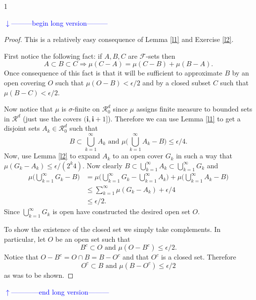 \documentclass[10pt,letterpaper,twocolumn]{article}
\newcommand{\bs}{\boldsymbol}
\def\Ver{1}
\def\LongVer{1}
\begin{document}
\if\Ver\LongVer{ 
{\flushleft\textcolor{blue}{$\downarrow$---------begin long version---------}}\newline



\begin{proof} This is a relatively easy consequence of Lemma \ref{l1} and Exercise \ref{l2}. 


First notice the following fact: if $A,B,C$ are $\mathcal F$-sets then
\begin{equation}
\label{trans}
 A\subset B\subset C \Rightarrow \mu(C-A)=\mu(C-B)+\mu(B-A). \end{equation}
Once consequence of this fact is that it will be sufficient to approximate $B$ by an open covering $O$ such that $\mathcal \mu(O-B)<\epsilon/2$ and by a closed subset $C$ such that $\mathcal \mu(B-C)<\epsilon/2$.

Now notice that $\mu$ is $\sigma$-finite on $\mathcal R_0^d$ 
since $\mu$ assigns finite measure to bounded sets in $\mathcal R^d$ (just use the covers $(\bs i,\bs i+1]$). Therefore we can use Lemma \ref{l1} to get a disjoint sets $A_k\in\mathcal R^d_0$ such that
\[ B\subset \bigcup_{k=1}^\infty A_k \text{ and } \mu\bigl( \bigcup_{k=1}^\infty A_k-B \bigr)\leq \epsilon/4. \]
Now, use Lemma \ref{l2} to expand $A_k$ to an open cover $G_k$ in such a way that $\mu(G_k-A_k)\leq \epsilon /(2^k 4)$. Now clearly $B\subset \bigcup_{k=1}^\infty A_k\subset  \bigcup_{k=1}^\infty G_k$ and 
\begin{align*}
\mu\bigl( \bigcup_{k=1}^\infty G_k-B \bigr) &= \mu\bigl(\bigcup_{k=1}^\infty G_k - \bigcup_{k=1}^\infty A_k \bigr)+ \mu\bigl( \bigcup_{k=1}^\infty A_k-B \bigr) \\
&\leq \sum_{k=1}^\infty \mu(G_k - A_k) + \epsilon/4\\
&\leq \epsilon/2.
\end{align*}
Since  $\bigcup_{k=1}^\infty G_k$ is open have constructed the desired open set $O$.

To show the existence of the closed set we simply take complements. In particular, let $O$ be an open set such that 
\[ B^c \subset O\text{ and } \mu(O - B^c)\leq \epsilon/2.\]
Notice that $O-B^c = O\cap B = B - O^c$  and that $O^c$ is a closed set. Therefore
\[ O^c \subset B\text{ and } \mu(B - O^c)\leq \epsilon/2\]
as was to be shown.
\end{proof}

%
{\flushleft\textcolor{blue}{$\uparrow$------------end long version---------}}\newline
} \fi
\end{document}

